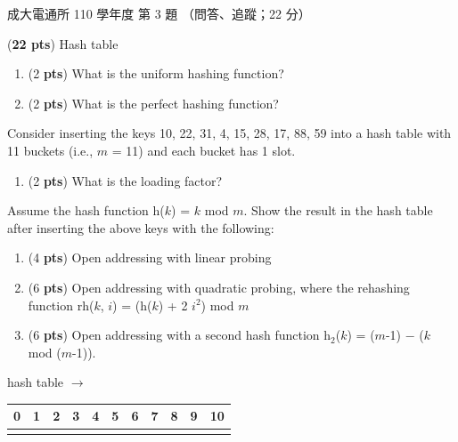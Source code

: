 \begin{pastexam}[label={px:ncku-110-cce-ds-03}]{成大電通所 110 學年度 第 3 題}
（問答、追蹤；22 分）

(\textbf{22 pts}) Hash table
\begin{enumerate}[label=\alph*.]
\item (2 \textbf{pts}) What is the uniform hashing function?
\item (2 \textbf{pts}) What is the perfect hashing function?
\end{enumerate}
Consider inserting the keys 10, 22, 31, 4, 15, 28, 17, 88, 59 into a hash table with 11 buckets (i.e., $m$ = 11) and each bucket has 1 slot.
\begin{enumerate}[label=\alph*.,start=3]
\item (2 \textbf{pts}) What is the loading factor?
\end{enumerate}
Assume the hash function h($k$) = $k$ mod $m$. Show the result in the hash table after inserting the above keys with the following:
\begin{enumerate}[label=\alph*.,start=4]
\item (4 \textbf{pts}) Open addressing with linear probing
\item (6 \textbf{pts}) Open addressing with quadratic probing, where the rehashing function rh($k$, $i$) = (h($k$) + 2 $i^2$) mod $m$
\item (6 \textbf{pts}) Open addressing with a second hash function h$_2$($k$) = ($m$-1) $-$ ($k$ mod ($m$-1)).
\end{enumerate}

hash table $\longrightarrow$
\begin{tabular}{|c|c|c|c|c|c|c|c|c|c|c|}
\multicolumn{1}{c}{0} & \multicolumn{1}{c}{1} & \multicolumn{1}{c}{2} & \multicolumn{1}{c}{3} & \multicolumn{1}{c}{4} & \multicolumn{1}{c}{5} & \multicolumn{1}{c}{6} & \multicolumn{1}{c}{7} & \multicolumn{1}{c}{8} & \multicolumn{1}{c}{9} & \multicolumn{1}{c}{10}\\\hline
\hspace{1em} & \hspace{1em} & \hspace{1em} & \hspace{1em} & \hspace{1em} & \hspace{1em} & \hspace{1em} & \hspace{1em} & \hspace{1em} & \hspace{1em} & \hspace{1em}\\\hline
\end{tabular}
\end{pastexam}

